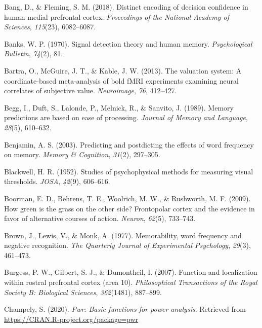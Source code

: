 \documentclass[12pt,twoside]{reedthesis}
\begin{document}
\leavevmode\hypertarget{ref-bang2018distinct}{}%
Bang, D., \& Fleming, S. M. (2018). Distinct encoding of decision confidence in human medial prefrontal cortex. \emph{Proceedings of the National Academy of Sciences}, \emph{115}(23), 6082--6087.

\leavevmode\hypertarget{ref-banks1970signal}{}%
Banks, W. P. (1970). Signal detection theory and human memory. \emph{Psychological Bulletin}, \emph{74}(2), 81.

\leavevmode\hypertarget{ref-bartra2013valuation}{}%
Bartra, O., McGuire, J. T., \& Kable, J. W. (2013). The valuation system: A coordinate-based meta-analysis of bold fMRI experiments examining neural correlates of subjective value. \emph{Neuroimage}, \emph{76}, 412--427.

\leavevmode\hypertarget{ref-begg1989memory}{}%
Begg, I., Duft, S., Lalonde, P., Melnick, R., \& Sanvito, J. (1989). Memory predictions are based on ease of processing. \emph{Journal of Memory and Language}, \emph{28}(5), 610--632.

\leavevmode\hypertarget{ref-benjamin2003predicting}{}%
Benjamin, A. S. (2003). Predicting and postdicting the effects of word frequency on memory. \emph{Memory \& Cognition}, \emph{31}(2), 297--305.

\leavevmode\hypertarget{ref-blackwell1952studies}{}%
Blackwell, H. R. (1952). Studies of psychophysical methods for measuring visual thresholds. \emph{JOSA}, \emph{42}(9), 606--616.

\leavevmode\hypertarget{ref-boorman2009green}{}%
Boorman, E. D., Behrens, T. E., Woolrich, M. W., \& Rushworth, M. F. (2009). How green is the grass on the other side? Frontopolar cortex and the evidence in favor of alternative courses of action. \emph{Neuron}, \emph{62}(5), 733--743.

\leavevmode\hypertarget{ref-brown1977memorability}{}%
Brown, J., Lewis, V., \& Monk, A. (1977). Memorability, word frequency and negative recognition. \emph{The Quarterly Journal of Experimental Psychology}, \emph{29}(3), 461--473.

\leavevmode\hypertarget{ref-burgess2007function}{}%
Burgess, P. W., Gilbert, S. J., \& Dumontheil, I. (2007). Function and localization within rostral prefrontal cortex (area 10). \emph{Philosophical Transactions of the Royal Society B: Biological Sciences}, \emph{362}(1481), 887--899.

\leavevmode\hypertarget{ref-R-pwr}{}%
Champely, S. (2020). \emph{Pwr: Basic functions for power analysis}. Retrieved from \url{https://CRAN.R-project.org/package=pwr}
\end{document}

